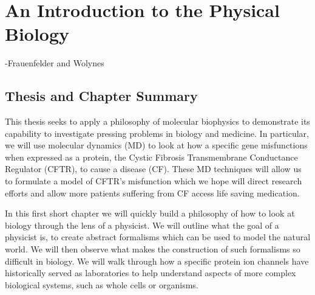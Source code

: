 \chapter{An Introduction to the Physical Biology}
\setcounter{page}{1}
\label{chap:introduction}
 {-Frauenfelder and Wolynes \cite{frauenfelder1994}}
\vspace
\section{Thesis and Chapter Summary}

This thesis seeks to apply a philosophy of molecular biophysics to demonstrate its capability to investigate pressing problems in biology and medicine. In particular, we will use molecular dynamics (MD) to look at how a specific gene misfunctions when expressed as a protein, the Cystic Fibrosis Transmembrane Conductance Regulator (CFTR), to cause a disease (CF). These MD techniques will allow us to formulate a model of CFTR's misfunction which we hope will direct research efforts and allow more patients suffering from CF access life saving medication. 

In this first short chapter we will quickly build a philosophy of how to look at biology through the lens of a physicist. We will outline what the goal of a physicist is, to create abstract formalisms which can be used to model the natural world. We will then observe what makes the construction of such formalisms so difficult in biology. We will walk through how a specific protein ion channels have historically served as laboratories to help understand aspects of more complex biological systems, such as whole cells or organisms. 

